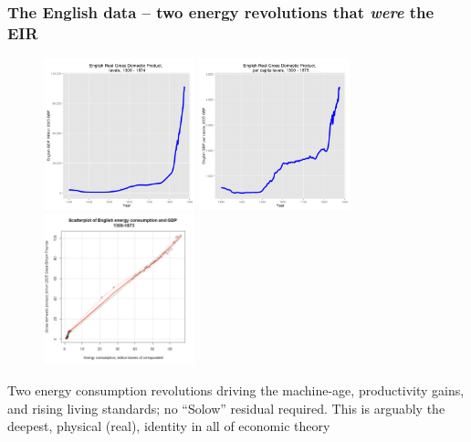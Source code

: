 \documentclass[final]{beamer}
\begin{document}
\begin{frame}
\frametitle{The English data -- two energy revolutions that \textit{\textbf{were}} the EIR}
\begin{figure}[p!]
\label{fig:scatterplot}
		\centerline{
		\mbox{\includegraphics[width=0.39\textwidth]{ggdp}}
		\mbox{\includegraphics[width=0.39\textwidth]{ggdppop}}
		\mbox{\includegraphics[width=0.39\textwidth]{scatterplot.png}}
		}
\end{figure} \vspace*{-0.4in}
Two energy consumption revolutions driving the machine-age, productivity gains, and rising living standards; no ``Solow'' residual required. This is arguably the deepest, physical (real), identity in all of economic theory
\end{frame}
\end{document}
